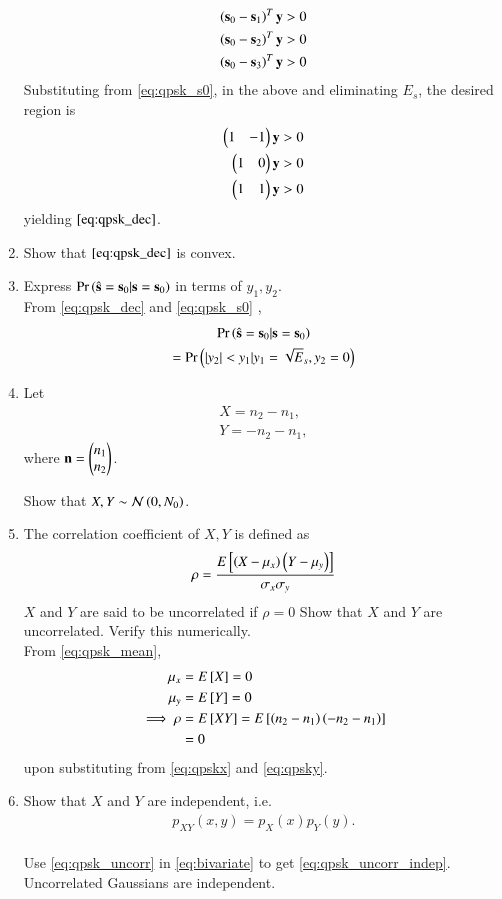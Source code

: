 \documentclass[journal,12pt,twocolumn]{IEEEtran}
\renewcommand\thesection{\arabic{section}}
\begin{document}
\begin{enumerate}[label=\thesection.\arabic*.,ref=\thesection.\theenumi]
%
\begin{align}
\left(\mathbf{s}_0-\mathbf{s}_1\right)^T\mathbf{y} &> 0
\\
\left(\mathbf{s}_0-\mathbf{s}_2\right)^T\mathbf{y} &> 0
\\
\left(\mathbf{s}_0-\mathbf{s}_3\right)^T\mathbf{y} &> 0
\end{align}
%
Substituting from \eqref{eq:qpsk_s0}, in the above and eliminating $E_s$, the desired region is
%
\begin{align}
\begin{pmatrix}1 & -1\end{pmatrix}\mathbf{y}&> 0
\\
\begin{pmatrix}1 & 0\end{pmatrix}\mathbf{y}&> 0
\\
\begin{pmatrix}1 & 1\end{pmatrix}\mathbf{y}&> 0
\end{align}
%
yielding $\eqref{eq:qpsk_dec}$.  
\item Show that $\eqref{eq:qpsk_dec}$ is convex.

\item Express $\Pr\left(\hat{\mathbf{s}} = \mathbf{s}_0|\mathbf{s} = \mathbf{s}_0\right)$ in terms of 
$y_1, y_2$.
\\
\solution From \eqref{eq:qpsk_dec} and \eqref{eq:qpsk_s0}
,
\begin{multline}
\label{eq:ser_dec}
\Pr\left(\hat{\mathbf{s}} = \mathbf{s}_0|\mathbf{s} = \mathbf{s}_0\right) 
\\
= \Pr\left(\left\vert y_2\right\vert < y_1
|y_1 = \sqrt{E}_s, y_2 = 0\right)
\end{multline}
\item Let 
\label{prob:qpsk_xy}
\begin{align}
\label{eq:qpskx}
X=n_2-n_1, 
\\
Y = -n_2-n_1, 
\label{eq:qpsky}
\end{align}
where $\mathbf{n}=\begin{pmatrix}n_1\\n_2\end{pmatrix}$.

Show that $X,Y \sim \mathcal{N}\left(0,N_0\right)$.

\item The correlation coefficient of $X, Y$ is defined as
%
\begin{align}
\rho = \frac{E{}\left[\left(X-\mu_x\right)\left(Y-\mu_y\right)\right]}{\sigma_x\sigma_y}
\end{align}
%
$X$ and $Y$ are said to be uncorrelated if $\rho = 0$
Show that  $X$ and $Y$ are uncorrelated. 
Verify this numerically.
\\
\solution From \eqref{eq:qpsk_mean},
\begin{align}
\mu_x &= E{}\left[X\right] = 0
\\
\mu_y &= E{}\left[Y\right] = 0
\\
\implies \rho &= E{}\left[XY\right] = E{}\left[\left(n_2-n_1\right)\left(-n_2-n_1\right)\right] 
\nonumber \\
&= 0
\label{eq:qpsk_uncorr}
\end{align}
%
upon substituting from \eqref{eq:qpskx} and \eqref{eq:qpsky}.
\item
Show that $X$ and $Y$ are independent, i.e. 
\begin{align}
\label{eq:qpsk_uncorr_indep}
p_{XY}(x,y) = p_{X}(x)p_{Y}(y).
\end{align}
\\
\solution Use \eqref{eq:qpsk_uncorr} in 
\eqref{eq:bivariate} to get \eqref{eq:qpsk_uncorr_indep}.  Uncorrelated Gaussians are independent.


\end{enumerate}
\end{document}
